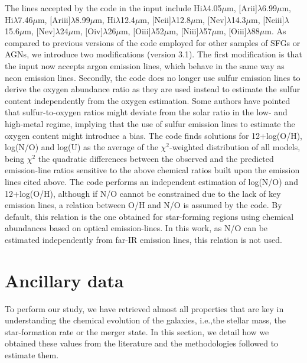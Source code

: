 \documentclass{nature2}
\newcommand{\ie}{i.e.,}
\begin{document}
The lines accepted by the code in the input include
 H{\sc i}\ensuremath{\lambda}4.05\ensuremath{\mu}m, [Ar{\sc ii}]\ensuremath{\lambda}6.99\ensuremath{\mu}m, H{\sc i}\ensuremath{\lambda}7.46\ensuremath{\mu}m, [Ar{\sc iii}]\ensuremath{\lambda}8.99\ensuremath{\mu}m, H{\sc i}\ensuremath{\lambda}12.4\ensuremath{\mu}m, [Ne{\sc ii}]\ensuremath{\lambda}12.8\ensuremath{\mu}m, [Ne{\sc v}]\ensuremath{\lambda}14.3\ensuremath{\mu}m, [Ne{\sc iii}]\ensuremath{\lambda}15.6\ensuremath{\mu}m, [Ne{\sc v}]\ensuremath{\lambda}24\ensuremath{\mu}m, [O{\sc iv}]\ensuremath{\lambda}26\ensuremath{\mu}m, [O{\sc iii}]\ensuremath{\lambda}52\ensuremath{\mu}m, [N{\sc iii}]\ensuremath{\lambda}57\ensuremath{\mu}m, [O{\sc iii}]\ensuremath{\lambda}88\ensuremath{\mu}m.
As compared to previous versions of the code employed for other samples of SFGs\cite{FO21} or AGNs\cite{PD22}, we introduce two modifications (version 3.1). The first modification is that the input now accepts argon emission lines, which behave in the same way as neon emission lines. Secondly, the code does no longer use sulfur emission lines to derive the oxygen abundance ratio as they are used instead to estimate the sulfur content independently from the oxygen estimation. Some authors\cite{PM06, DiazZamora_2022} have pointed that sulfur-to-oxygen ratios might deviate from the solar ratio in the low- and high-metal regime, implying that the use of sulfur emission lines to estimate the oxygen content might introduce a bias. The code finds solutions for  12+log(O/H), log(N/O) and log(U) as the average of the \ensuremath{\chi^{2}}-weighted distribution of all models, being \ensuremath{\chi^{2}} the quadratic differences between the observed and the predicted emission-line ratios sensitive to the above chemical ratios built upon the emission lines cited above. The code performs an independent estimation of log(N/O) and 12+log(O/H), although if N/O cannot be constrained due to the lack of key emission lines, a relation between O/H and N/O is assumed by the code. By default, this relation is the one obtained for star-forming regions using chemical abundances based on  optical emission-lines\cite{PMContini_2009, PM14}. In this work, as N/O can be estimated independently from far-IR emission lines, this relation is not used.

\section{Ancillary data}
\label{sec:ancillary}
To perform our study, we have retrieved almost all properties that are key in understanding the chemical evolution of the galaxies, \ie the stellar mass, the star-formation rate or the merger state. In this section, we detail how we obtained these values from the literature and the methodologies followed to estimate them.
\end{document}
